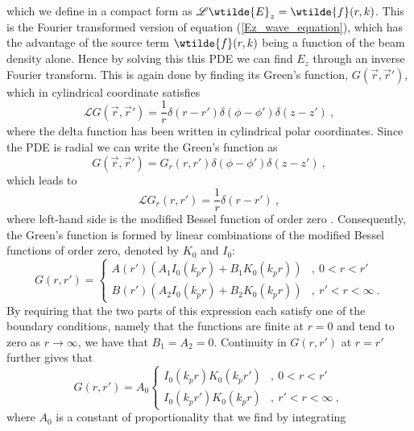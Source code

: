 which we define in a compact form as $\mathscr{L}\wtilde{E}_z= \wtilde{f}(r,k)$. This is the Fourier transformed version of equation (\ref{Ez_wave_equation}), which has the advantage of the source term $\wtilde{f}(r,k)$ being a function of the beam density alone. Hence by solving this this PDE we can find $E_z$ through an inverse Fourier transform. This is again done by finding its Green's function, $G(\vec{r},\vec{r}')$, which in cylindrical coordinate satisfies
\begin{equation}
\mathscr{L}G(\vec{r},\vec{r}')=\frac{1}{r}\delta(r-r')\delta(\phi-\phi')\delta(z-z')~,
\end{equation}
where the delta function has been written in cylindrical polar coordinates. Since the PDE is radial we can write the Green's function as
\begin{equation}
G(\vec{r},\vec{r}')=G_r(r,r')\delta(\phi-\phi')\delta(z-z')~,
\end{equation}
which leads to 
\begin{equation}
\mathscr{L}G_r(r,r')=\frac{1}{r}\delta(r-r')~,
\label{greens_diff_eq}
\end{equation}
where left-hand side is the modified Bessel function of order zero \cite{Jackson1962}. Consequently, the Green's function is formed by linear combinations of the modified Bessel functions of order zero, denoted by $K_0$ and $I_0$: %
\begin{equation}
G\left(r,r'\right)=\left\{ \begin{array}{ll}
A(r')(A_1 I_0(k_pr)+B_1K_0(k_pr)) &,~ 0<r<r'\\
B(r')(A_2 I_0(k_pr)+B_2K_0(k_pr))  &,~ r'<r<\infty~.
\end{array}\right.
\end{equation} %
By requiring that the two parts of this expression each satisfy one of the boundary conditions, namely that the functions are finite at $r=0$ and tend to zero as $r\to\infty$, we have that $B_1=A_2=0$. Continuity in $G(r,r')$ at $r=r'$ further gives that 
\begin{equation}
G\left(r,r'\right)=A_0\left\{ \begin{array}{ll}
I_0(k_pr)K_0(k_pr') &,~ 0<r<r'\\
I_0(k_pr')K_0(k_pr)  &,~ r'<r<\infty~,
\end{array}\right.
\end{equation}
where $A_0$ is a constant of proportionality that we find by integrating %
